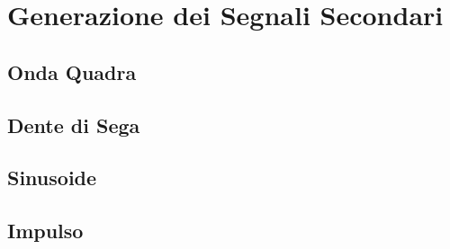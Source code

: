 \chapter{Generazione dei Segnali Secondari}

\lipsum[2-4]


\section{Onda Quadra}

\lipsum[2-4]


\section{Dente di Sega}

\lipsum[2-4]


\section{Sinusoide}

\lipsum[2-4]


\section{Impulso}

\lipsum[2-4]
